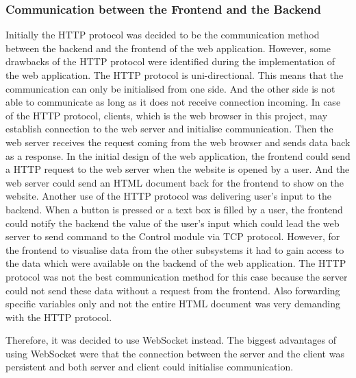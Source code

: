 \documentclass[a4paper]{article}
\begin{document}
\subsubsection{Communication between the Frontend and the Backend}

Initially the HTTP protocol was decided to be the communication method between the 
backend and the frontend of the web application. However, some drawbacks of the HTTP 
protocol were identified during the implementation of the web application. The HTTP 
protocol is uni-directional. \cite{HTTPOverview} This means that the communication can only 
be initialised from one side. And the other side is not able to communicate as long 
as it does not receive connection incoming. In case of the HTTP protocol, clients, 
which is the web browser in this project, may establish connection to the web server 
and initialise communication. Then the web server receives the request coming from the 
web browser and sends data back as a response. In the initial design of the web application, 
the frontend could send a HTTP request to the web server when the website is opened by a user. 
And the web server could send an HTML document back for the frontend to show on the website. 
Another use of the HTTP protocol was delivering user’s input to the backend. When a button 
is pressed or a text box is filled by a user, the frontend could notify the backend the 
value of the user’s input which could lead the web server to send command to the Control 
module via TCP protocol. However, for the frontend to visualise data from the other subsystems 
it had to gain access to the data which were available on the backend of the web application. 
The HTTP protocol was not the best communication method for this case because the server could 
not send these data without a request from the frontend. Also forwarding specific variables only 
and not the entire HTML document was very demanding with the HTTP protocol. 

Therefore, it was decided to use WebSocket instead. The biggest advantages of using WebSocket 
were that the connection between the server and the client was persistent and both server and 
client could initialise communication. 
\end{document}
